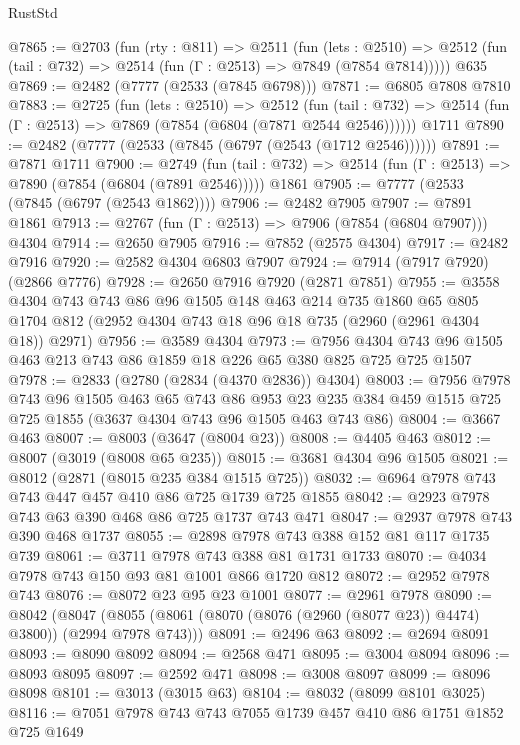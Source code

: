 \begin{lexlean}{RustStd}
\begin{coremodule}
@7865 := @2703
    (fun (rty : @811) =>
    @2511
      (fun (lets : @2510) =>
      @2512 (fun (tail : @732) => @2514 (fun (Γ : @2513) => @7849 (@7854 @7814)))))
    @635
@7869 := @2482 (@7777 (@2533 (@7845 @6798)))
@7871 := @6805 @7808 @7810
@7883 := @2725
    (fun (lets : @2510) =>
    @2512
      (fun (tail : @732) => @2514 (fun (Γ : @2513) => @7869 (@7854 (@6804 (@7871 @2544 @2546))))))
    @1711
@7890 := @2482 (@7777 (@2533 (@7845 (@6797 (@2543 (@1712 @2546))))))
@7891 := @7871 @1711
@7900 := @2749
    (fun (tail : @732) => @2514 (fun (Γ : @2513) => @7890 (@7854 (@6804 (@7891 @2546)))))
    @1861
@7905 := @7777 (@2533 (@7845 (@6797 (@2543 @1862))))
@7906 := @2482 @7905
@7907 := @7891 @1861
@7913 := @2767 (fun (Γ : @2513) => @7906 (@7854 (@6804 @7907))) @4304
@7914 := @2650 @7905
@7916 := @7852 (@2575 @4304)
@7917 := @2482 @7916
@7920 := @2582 @4304 @6803 @7907
@7924 := @7914 (@7917 @7920) (@2866 @7776)
@7928 := @2650 @7916 @7920 (@2871 @7851)
@7955 := @3558
    @4304
    @743
    @743
    @86
    @96
    @1505
    @148
    @463
    @214
    @735
    @1860
    @65
    @805
    @1704
    @812
    (@2952 @4304 @743 @18 @96 @18 @735 (@2960 (@2961 @4304 @18)) @2971)
@7956 := @3589 @4304
@7973 := @7956 @4304 @743 @96 @1505 @463 @213 @743 @86 @1859 @18 @226 @65 @380 @825 @725 @725 @1507
@7978 := @2833 (@2780 (@2834 (@4370 @2836)) @4304)
@8003 := @7956
    @7978
    @743
    @96
    @1505
    @463
    @65
    @743
    @86
    @953
    @23
    @235
    @384
    @459
    @1515
    @725
    @725
    @1855
    (@3637 @4304 @743 @96 @1505 @463 @743 @86)
@8004 := @3667 @463
@8007 := @8003 (@3647 (@8004 @23))
@8008 := @4405 @463
@8012 := @8007 (@3019 (@8008 @65 @235))
@8015 := @3681 @4304 @96 @1505
@8021 := @8012 (@2871 (@8015 @235 @384 @1515 @725))
@8032 := @6964 @7978 @743 @743 @447 @457 @410 @86 @725 @1739 @725 @1855
@8042 := @2923 @7978 @743 @63 @390 @468 @86 @725 @1737 @743 @471
@8047 := @2937 @7978 @743 @390 @468 @1737
@8055 := @2898 @7978 @743 @388 @152 @81 @117 @1735 @739
@8061 := @3711 @7978 @743 @388 @81 @1731 @1733
@8070 := @4034 @7978 @743 @150 @93 @81 @1001 @866 @1720 @812
@8072 := @2952 @7978 @743
@8076 := @8072 @23 @95 @23 @1001
@8077 := @2961 @7978
@8090 := @8042
    (@8047 (@8055 (@8061 (@8070 (@8076 (@2960 (@8077 @23)) @4474) @3800)) (@2994 @7978 @743)))
@8091 := @2496 @63
@8092 := @2694 @8091
@8093 := @8090 @8092
@8094 := @2568 @471
@8095 := @3004 @8094
@8096 := @8093 @8095
@8097 := @2592 @471
@8098 := @3008 @8097
@8099 := @8096 @8098
@8101 := @3013 (@3015 @63)
@8104 := @8032 (@8099 @8101 @3025)
@8116 := @7051 @7978 @743 @743 @7055 @1739 @457 @410 @86 @1751 @1852 @725 @1649

\end{coremodule}
\end{lexlean}
